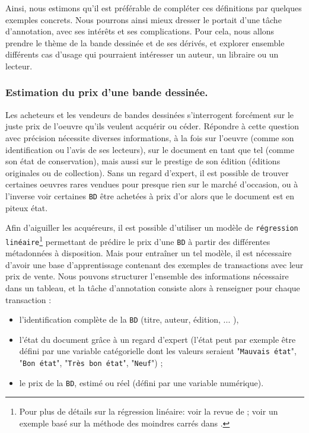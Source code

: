 		Ainsi, nous estimons qu'il est préférable de compléter ces définitions par quelques exemples concrets.
		Nous pourrons ainsi mieux dresser le portait d'une tâche d'annotation, avec ses intérêts et ses complications.
		Pour cela, nous allons prendre le thème de la bande dessinée et de ses dérivés, et explorer ensemble différents cas d'usage qui pourraient intéresser un auteur, un libraire ou un lecteur.
		
		
		\subsubsection{Estimation du prix d'une bande dessinée.}
		\label{section:2.1.2.A-PRESENTATION-ANNOTATION-EXEMPLES-REGRESSION}
		
			Les acheteurs et les vendeurs de bandes dessinées s'interrogent forcément sur le juste prix de l'oeuvre qu'ils veulent acquérir ou céder.
			Répondre à cette question avec précision nécessite diverses informations, à la fois sur l'oeuvre (comme son identification ou l'avis de ses lecteurs), sur le document en tant que tel (comme son état de conservation), mais aussi sur le prestige de son édition (éditions originales ou de collection).
			Sans un regard d'expert, il est possible de trouver certaines oeuvres rares vendues pour presque rien sur le marché d'occasion, ou à l'inverse voir certaines \texttt{BD} être achetées à prix d'or alors que le document est en piteux état.
			
			Afin d'aiguiller les acquéreurs, il est possible d'utiliser un modèle de \texttt{régression linéaire}\footnote{
				Pour plus de détails sur la régression linéaire: voir la revue de \cite{maalouf:2011:logistic-regression-data} ; voir un exemple basé sur la méthode des moindres carrés dans \cite{zdaniuk:2014:ordinary-leastsquares-ols}.
			} permettant de prédire le prix d'une \texttt{BD} à partir des différentes métadonnées à disposition.
			Mais pour entraîner un tel modèle, il est nécessaire d'avoir une base d'apprentissage contenant des exemples de transactions avec leur prix de vente.
			Nous pouvons structurer l'ensemble des informations nécessaire dans un tableau, et la tâche d'annotation consiste alors à renseigner pour chaque transaction :
			\begin{itemize}
				\item l'identification complète de la \texttt{BD} (titre, auteur, édition, ... ),
				\item l'état du document grâce à un regard d'expert (l'état peut par exemple être défini par une variable catégorielle dont les valeurs seraient "\texttt{Mauvais état}", "\texttt{Bon état}", "\texttt{Très bon état}", "\texttt{Neuf}") ;
				\item le prix de la \texttt{BD}, estimé ou réel (défini par une variable numérique).
			\end{itemize}
			
